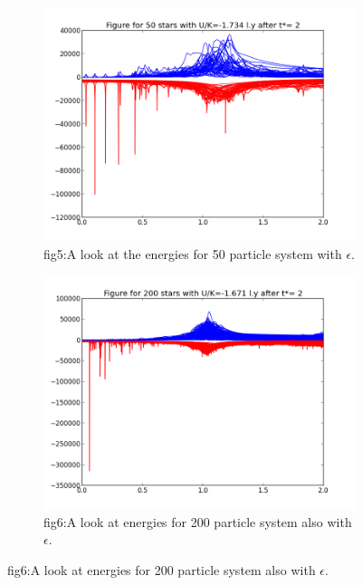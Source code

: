 \documentclass{article}
\begin{document}
\begin{figure}
\centering
\begin{subfigure}{.65\textwidth}
  \centering
  \hspace{-6cm}
  \includegraphics[scale=0.45]{e1-50.png}
  \caption{fig5:A look at the energies for 50 particle system with $\epsilon$.}
  \hspace{-6cm}
  \label{fig:sub1}
\end{subfigure}%
\begin{subfigure}{.65\textwidth}
  \hspace{-5cm}
  \centering
  \includegraphics[scale=0.45]{e1-200.png}
  \caption{fig6:A look at energies for 200 particle system also with $\epsilon$.}
  \label{fig:sub2}
\end{subfigure}
\label{fig:test}

\end{figure}
\end{document}
